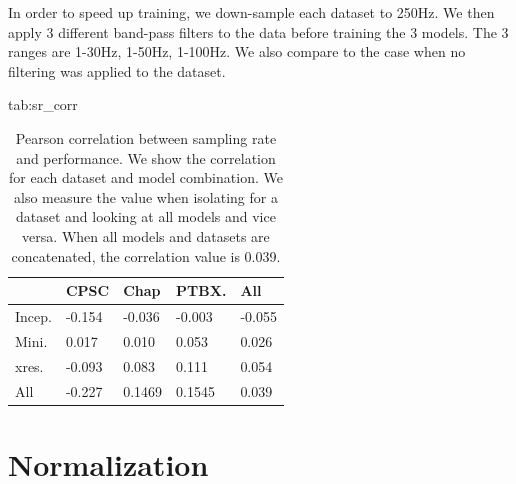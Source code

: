 \documentclass[pmlr,twocolumn]{jmlr}%
\begin{document}
In order to speed up training, we down-sample each dataset to 250Hz. We then apply 3 different band-pass filters to the data before training the 3 models. The 3 ranges are 1-30Hz, 1-50Hz, 1-100Hz. We also compare to the case when no filtering was applied to the dataset. 


\begin{table}[hbtp]
\floatconts
  {tab:sr_corr}
  {\caption{Pearson correlation between sampling rate and performance. We show the correlation for each dataset and model combination. We also measure the value when isolating for a dataset and looking at all models and vice versa. When all models and datasets are concatenated, the correlation value is 0.039. }}
  {\begin{tabular}{|llll|l|}
  \hline
   & \bfseries CPSC & \bfseries Chap & \bfseries PTBX. & \bfseries All\\\hline
  
  Incep.  & -0.154  & -0.036 & -0.003 & -0.055      \\
  Mini. & 0.017   & 0.010   & 0.053   & 0.026       \\
  xres.    & -0.093 & 0.083  & 0.111    & 0.054       \\
  \hline
  All & -0.227  & 0.1469   & 0.1545  & 0.039   \\
  \hline
  \end{tabular}}
\end{table}


\section{Normalization}
\label{sec:Norm}




\appendix
\end{document}
